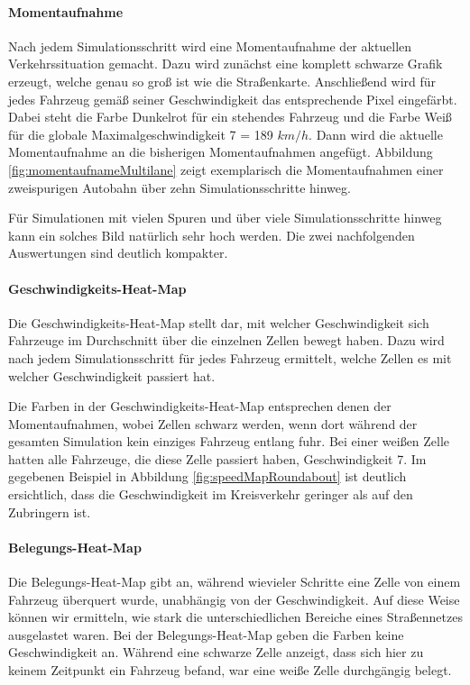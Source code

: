 \documentclass[10pt, a4paper]{article}
\begin{document}
\paragraph{Momentaufnahme}
\label{paragraph:momentaufnahme}

Nach jedem Simulationsschritt wird eine Momentaufnahme der aktuellen Verkehrssituation gemacht. Dazu wird zunächst eine komplett schwarze Grafik erzeugt, welche genau so groß ist wie die Straßenkarte. Anschließend wird für jedes Fahrzeug gemäß seiner Geschwindigkeit das entsprechende Pixel eingefärbt. Dabei steht die Farbe Dunkelrot für ein stehendes Fahrzeug und die Farbe Weiß für die globale Maximalgeschwindigkeit 7 = 189 $km/h$. Dann wird die aktuelle Momentaufnahme an die bisherigen Momentaufnahmen angefügt. Abbildung \ref{fig:momentaufnameMultilane} zeigt exemplarisch die Momentaufnahmen einer zweispurigen Autobahn über zehn Simulationsschritte hinweg.

Für Simulationen mit vielen Spuren und über viele Simulationsschritte hinweg kann ein solches Bild natürlich sehr hoch werden. Die zwei nachfolgenden Auswertungen sind deutlich kompakter.

\paragraph{Geschwindigkeits-Heat-Map}
\label{paragraph:speedmap}

Die Geschwindigkeits-Heat-Map stellt dar, mit welcher Geschwindigkeit sich Fahrzeuge im Durchschnitt über die einzelnen Zellen bewegt haben. Dazu wird nach jedem Simulationsschritt für jedes Fahrzeug ermittelt, welche Zellen es mit welcher Geschwindigkeit passiert hat.

Die Farben in der Geschwindigkeits-Heat-Map entsprechen denen der Momentaufnahmen, wobei Zellen schwarz werden, wenn dort während der gesamten Simulation kein einziges Fahrzeug entlang fuhr. Bei einer weißen Zelle hatten alle Fahrzeuge, die diese Zelle passiert haben, Geschwindigkeit 7. Im gegebenen Beispiel in Abbildung \ref{fig:speedMapRoundabout} ist deutlich ersichtlich, dass die Geschwindigkeit im Kreisverkehr geringer als auf den Zubringern ist.

\paragraph{Belegungs-Heat-Map}
\label{paragraph:occupancymap}
Die Belegungs-Heat-Map gibt an, während wievieler Schritte eine Zelle von einem Fahrzeug überquert wurde, unabhängig von der Geschwindigkeit. Auf diese Weise können wir ermitteln, wie stark die unterschiedlichen Bereiche eines Straßennetzes ausgelastet waren. Bei der Belegungs-Heat-Map geben die Farben keine Geschwindigkeit an. Während eine schwarze Zelle anzeigt, dass sich hier zu keinem Zeitpunkt ein Fahrzeug befand, war eine weiße Zelle durchgängig belegt.
\end{document}
